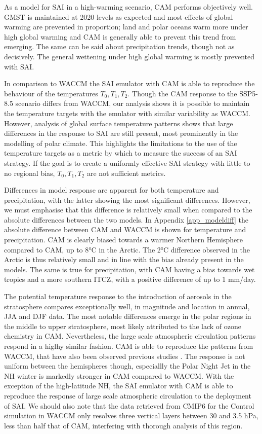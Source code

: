As a model for SAI in a high-warming scenario, CAM performs objectively well. GMST is maintained at 2020 levels as expected and most effects of global warming are prevented in proportion; land and polar oceans warm more under high global warming and CAM is generally able to prevent this trend from emerging. The same can be said about precipitation trends, though not as decisively. The general wettening under high global warming is mostly prevented with SAI. 

In comparison to WACCM the SAI emulator with CAM is able to reproduce the behaviour of the temperatures $T_0, T_1, T_2$. Though the CAM response to the SSP5-8.5 scenario differs from WACCM, our analysis shows it is possible to maintain the temperature targets with the emulator with similar variability as WACCM. However, analysis of global surface temperature patterns shows that large differences in the response to SAI are still present, most prominently in the modelling of polar climate. This highlights the limitations to the use of the temperature targets as a metric by which to measure the success of an SAI strategy. If the goal is to create a uniformly effective SAI strategy with little to no regional bias, $T_0, T_1, T_2$ are not sufficient metrics.

Differences in model response are apparent for both temperature and precipitation, with the latter showing the most significant differences. However, we must emphasise that this difference is relatively small when compared to the absolute differences between the two models. In Appendix \ref{app_modeldiff} the absolute difference between CAM and WACCM is shown for temperature and precipitation. CAM is clearly biased towards a warmer Northern Hemisphere compared to CAM, up to 8°C in the Arctic. The 2°C difference observed in the Arctic is thus relatively small and in line with the bias already present in the models. The same is true for precipitation, with CAM having a bias towards wet tropics and a more southern ITCZ, with a positive difference of up to 1 mm/day. 

The potential temperature response to the introduction of aerosols in the stratosphere compares exceptionally well, in magnitude and location in annual, JJA and DJF data. The most notable differences emerge in the polar regions in the middle to upper stratosphere, most likely attributed to the lack of ozone chemistry in CAM. Nevertheless, the large scale atmospheric circulation patterns respond in a higlhy similar fashion. CAM is able to reproduce the patterns from WACCM, that have also been observed previous studies \parencite{bednarz2023climate}. The response is not uniform between the hemispheres though, especiallly the Polar Night Jet in the NH winter is markedly stronger in CAM compared to WACCM. With the exception of the high-latitude NH, the SAI emulator with CAM is able to reproduce the response of large scale atmospheric circulation to the deployment of SAI. We should also note that the data retrieved from CMIP6 for the Control simulation in WACCM only resolves three vertical layers between 30 and 3.5 hPa, less than half that of CAM, interfering with thorough analysis of this region. 


